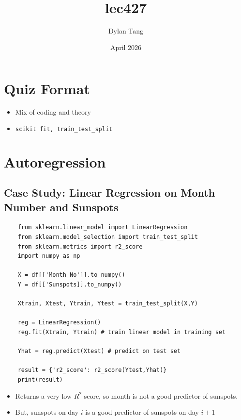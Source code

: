 \documentclass{article}
\title{lec427}
\author{Dylan Tang}
\date{April 2026}
\begin{document}
\maketitle

\section{Quiz Format}
\begin{itemize}
    \item Mix of coding and theory
    \item \texttt{scikit fit, train\_test\_split}
\end{itemize}

\section{Autoregression}

\subsection{Case Study: Linear Regression on Month Number and Sunspots}
\begin{verbatim}
    from sklearn.linear_model import LinearRegression
    from sklearn.model_selection import train_test_split
    from sklearn.metrics import r2_score
    import numpy as np

    X = df[['Month_No']].to_numpy()
    Y = df[['Sunspots]].to_numpy()

    Xtrain, Xtest, Ytrain, Ytest = train_test_split(X,Y)

    reg = LinearRegression()
    reg.fit(Xtrain, Ytrain) # train linear model in training set

    Yhat = reg.predict(Xtest) # predict on test set

    result = {'r2_score': r2_score(Ytest,Yhat)}
    print(result)
\end{verbatim}
\begin{itemize}
    \item Returns a very low $R^2$ score, so month is not a good predictor of sunspots.
    \item But, sunspots on day $i$ is a good predictor of sunspots on day $i+1$
\end{itemize}

\newpage
\end{document}
